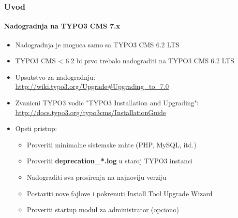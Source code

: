 \begin{frame}[fragile]
	\frametitle{Uvod}
	\framesubtitle{Nadogradnja na TYPO3 CMS 7.x}

	\begin{itemize}
		\item Nadogradnja je moguca samo sa  TYPO3 CMS 6.2 LTS
		\item TYPO3 CMS < 6.2 bi prvo trebalo nadograditi na  TYPO3 CMS 6.2 LTS
	\end{itemize}

	\begin{itemize}

		\item Upsutstvo za nadogradnju:\newline
			\smaller\url{http://wiki.typo3.org/Upgrade#Upgrading_to_7.0}\normalsize
		\item Zvanicni TYPO3 vodic  "TYPO3 Installation and Upgrading":
			\smaller\url{http://docs.typo3.org/typo3cms/InstallationGuide}\normalsize
		\item Opsti pristup:
			\begin{itemize}
				\item Proveriti minimalne sistemske zahte \small(PHP, MySQL, itd.)
				\item Proveriti \textbf{deprecation\_*.log} u staroj TYPO3 instanci
				\item Nadograditi sva prosirenja na najnoviju verziju
				\item Postaviti nove fajlove i pokrenuti Install Tool \textrightarrow Upgrade Wizard
				\item Proveriti startup modul za administrator  (opciono)
			\end{itemize}
	\end{itemize}

\end{frame}

